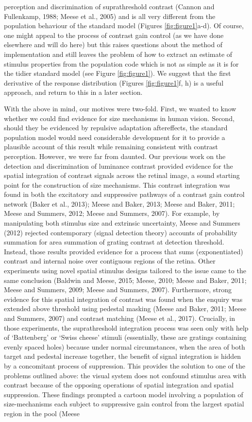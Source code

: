 \documentclass[
]{article}
\begin{document}
perception and discrimination of suprathreshold contrast (Cannon and Fullenkamp, 1988; Meese et al., 2005) and is all very different from the population behaviour of the standard model (Figures \ref{fig:figure1}a-d). Of course, one might appeal to the process of contrast gain control (as we have done elsewhere and will do here) but this raises questions about the method of implementation and still leaves the problem of how to extract an estimate of stimulus properties from the population code which is not as simple as it is for the tidier standard model (see Figure \ref{fig:figure1}). We suggest that the first derivative of the response distribution (Figures \ref{fig:figure1}f, h) is a useful approach, and return to this in a later section.

With the above in mind, our motives were two-fold. First, we wanted to know whether we could find evidence for size mechanisms in human vision. Second, should they be evidenced by repulsive adaptation aftereffects, the standard population model would need considerable development for it to provide a plausible account of this result while remaining consistent with contrast perception. However, we were far from daunted. Our previous work on the detection and discrimination of luminance contrast provided evidence for the spatial integration of contrast signals across the retinal image, a sound starting point for the construction of size mechanisms. This contrast integration was found in both the excitatory and suppressive pathways of a contrast gain control network (Baker et al., 2013); Meese and Baker, 2013; Meese and Baker, 2011; Meese and Summers, 2012; Meese and Summers, 2007). For example, by manipulating both stimulus size and extrinsic uncertainty, Meese and Summers (2012) rejected contemporary (signal detection theory) accounts of probability summation for area summation of grating contrast at detection threshold. Instead, those results provided evidence for a process that sums (exponentiated) contrast and internal noise over contiguous regions of the retina. Other experiments using novel spatial stimulus designs tailored to the issue came to the same conclusion (Baldwin and Meese, 2015; Meese, 2010; Meese and Baker, 2011; Meese and Summers, 2009; Meese and Summers, 2007). Furthermore, strong evidence for this spatial integration of contrast was found when the enquiry was extended above threshold using pedestal masking (Meese and Baker, 2011; Meese and Summers, 2007) and contrast matching (Meese et al., 2017). Crucially, in those experiments, the suprathreshold integration process was seen only with help of `Battenberg' or `Swiss cheese' stimuli (essentially, these are gratings containing evenly spaced holes) because under normal circumstances, when the area of both target and pedestal increase together, the benefit of signal integration is hidden by a concomitant process of suppression. This provides the solution to one of the problems outlined above: the visual system does not confound stimulus area with contrast because of the opposing operations of spatial integration and spatial suppression. These findings prompted a cartoon model involving a population of size-mechanisms each subject to suppressive gain control from the largest spatial region in the pool (Meese 
\end{document}

